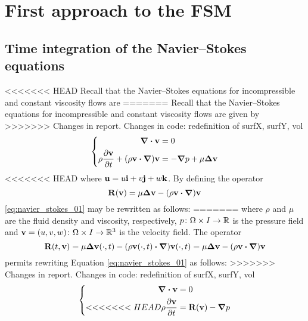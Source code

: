 
\section{First approach to the FSM}

\subsection{Time integration of the Navier--Stokes equations}

<<<<<<< HEAD
Recall that the Navier--Stokes equations for incompressible and constant viscosity flows are
=======
Recall that the Navier--Stokes equations for incompressible and constant viscosity flows are given by
>>>>>>> Changes in report. Changes in code: redefinition of surfX, surfY, vol
\begin{equation} \label{eq:navier_stokes_01}
    \left\{
    \begin{aligned}
        \div{\vb{v}} &= 0 \\
        \rho \pdv{\vb{v}}{t} + (\rho \vb{v} \vdot \grad) \vb{v} &= -\grad{p} + \mu \laplacian{\vb{v}}
    \end{aligned}
    \right.
\end{equation}
<<<<<<< HEAD
where $\vb{u} = u \vb{i} + v \vb{j} + w \vb{k}$. By defining the operator
\begin{equation}
    \vb{R}(\vb{v}) = \mu \laplacian{\vb{v}} - (\rho \vb{v} \vdot \grad) \vb{v}
\end{equation}
\eqref{eq:navier_stokes_01} may be rewritten as follows:
=======
where $\rho$ and $\mu$ are the fluid density and viscosity, respectively, $p \colon \Omega \times I \rightarrow \mathbb{R}$ is the pressure field and $\vb{v} = (u, v, w) \colon \Omega \times I \rightarrow \mathbb{R}^3$ is the velocity field. The operator
\begin{equation}
    \vb{R}(t,\vb{v}) = 
    \mu \laplacian{\vb{v}(\cdot,t)} - (\rho \vb{v}(\cdot,t) \vdot \grad) \vb{v}(\cdot,t) =
    \mu \laplacian{\vb{v}} - (\rho \vb{v} \vdot \grad) \vb{v}
\end{equation}
permits rewriting Equation \eqref{eq:navier_stokes_01} as follows:
>>>>>>> Changes in report. Changes in code: redefinition of surfX, surfY, vol
\begin{equation} \label{eq:navier_stokes_02}
    \left\{
    \begin{aligned}
        \div{\vb{v}} &= 0 \\
<<<<<<< HEAD
        \rho \pdv{\vb{v}}{t} &= \vb{R}(\vb{v}) - \grad{p}
    \end{aligned}
    \right.
\end{equation}

